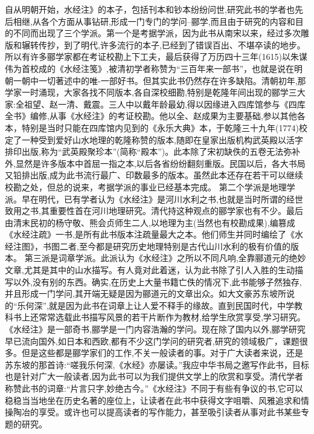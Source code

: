 \documentclass[12pt,UTF8]{ctexbook}
\begin{document}
自从明朝开始，水经注》的本子，包括刊本和钞本纷纷问世,研究此书的学者也先后相继,从各个方面从事钻研,形成一门专门的学问--郦学,而且由于研究的内容和目的不同而出现了三个学派。第一个是考据学派，因为此书从南宋以来，经过多次雕版和辗转传抄，到了明代,许多流行的本子,已经到了错误百出、不堪卒读的地步。所以有许多郦学家都在考证校勘上下工夫，最后获得了万历四十三年(1615)以朱谋伟为首校成的《水经注笺》,被清初学者称赞为“三百年来一部书”，也就是说在明朝一朝中一切著述中的唯-一部好书。但其实此书仍然存在许多缺陷。清朝初年,那学家一时涌现，大家各找不同版本,各自深校细勘,特别是乾隆年间出现的郦学三大家:全祖望、赵一清、戴震。三人中以戴年龄最幼,得以因缘进入四库馆参与《四库全书》编修,从事《水经注》的考证校勘。他以全、赵成果为主要基础,参以其他各本，特别是当时只能在四库馆内见到的《永乐大典》本，于乾隆三十九年(1774)校定了一种受到爱好山水地理的乾隆称赞的版本,随即在皇家出版机构武英殿以活字排印出版,称为“武英殿聚珍本”(简称“殿本”)。此本除了宋初缺佚的五卷无法弥补外,显然是许多版本中首屈一指之本,以后各省纷纷翻刻重版。民国以后，各大书局又铅排出版,成为此书流行最广、印数最多的版本。虽然此本还存在若干可以继续校勘之处，但总的说来，考据学派的事业已经基本完成。
第二个学派是地理学派。早在明代，已有学者认为《水经注》是河川水利之书,也就是当时所谓的经世致用之书,其重要性首在河川地理研究。清代持这种观点的郦学家也有不少。最后由清末民初的杨守敬、熊会贞师生二人,以地理为主(当然也有校勘成果),编篡成《水经注疏》一书,是所有此书版本注疏量最大之本。他们师生并同时编绘了《水经注图》，书图二者,至今都是研究历史地理特别是古代山川水利的极有价值的版本。
第三派是词章学派。此派认为《水经注》之所以不同凡响,全靠郦道元的绝妙文章,尤其是其中的山水描写。有人竟对此着迷，认为此书除了引人入胜的生动描写以外,没有别的东西。确实,在历史上大量书籍亡佚的情况下,此书能够子然独存,并且形成一门学问,其开端无疑是因为郦道元的文章出众。如大文豪苏东坡所说的“乐何深”,就是因为此书在词章上让人爱不释手的缘故。直到民国时代，中学教科书上还常常选载此书描写风景的若干片断作为教材,给学生欣赏享受,学习研究。
《水经注》是一部奇书,郦学是一门内容浩瀚的学问。现在除了国内以外,郦学研究早已流向国外,如日本和西欧,都有不少这门学问的研究者,研究的领域极广，课题很多。但是这些都是郦学家们的工作,不关一般读者的事。对于广大读者来说，还是苏东坡的那首诗:“嗟我乐何深,《水经》亦屡读。”我应中华书局之邀写作此书，目标也是针对广大一般读者,因为此书可以为我们提供文学上的欣赏和享受。清代学者称赞此书的词章:“片言只字,妙绝古今。”《水经注》不同于有些有争议的书,它可以稳稳当当地坐在历史名著的座位上，让读者在此书中获得文字咀嚼、风雅追求和情操陶冶的享受。或许也可以提高读者的写作能力，甚至吸引读者从事对此书某些专题的研究。
\end{document}
